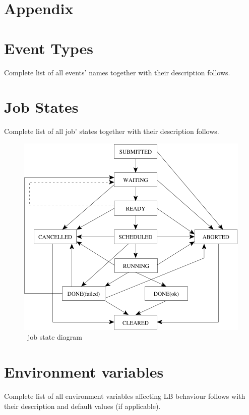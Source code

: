 \section*{Appendix}

\section{\LB Event Types}
\label{a:events}
Complete list of all events' names together with their description follows.


\newpage
\section{\LB Job States}
\label{a:jobstat}
Complete list of all job' states together with their description follows.


\begin{figure}[h]
\centering
\includegraphics[width=.6\hsize]{images/wms2-jobstat}
\caption{\LB\ job state diagram}
\end{figure}

\newpage
\section{Environment variables}
\label{a:environment}

Complete list of all environment variables affecting LB behaviour follows with 
their description and default values (if applicable).


